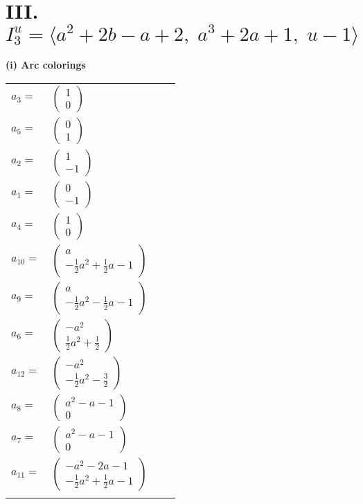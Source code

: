 \documentclass[1p]{elsarticle_modified}
\theoremstyle{definition}
\begin{document}
\centering \section*{III. $I^u_{3}= \langle a^2+2 b- a+2,\;a^3+2 a+1,\;u-1 \rangle$}
\flushleft \textbf{(i) Arc colorings}\\
\begin{tabular}{m{7pt} m{180pt} m{7pt} m{180pt} }
\flushright $a_{3}=$&$\begin{pmatrix}1\\0\end{pmatrix}$ \\
\flushright $a_{5}=$&$\begin{pmatrix}0\\1\end{pmatrix}$ \\
\flushright $a_{2}=$&$\begin{pmatrix}1\\-1\end{pmatrix}$ \\
\flushright $a_{1}=$&$\begin{pmatrix}0\\-1\end{pmatrix}$ \\
\flushright $a_{4}=$&$\begin{pmatrix}1\\0\end{pmatrix}$ \\
\flushright $a_{10}=$&$\begin{pmatrix}a\\-\frac{1}{2} a^2+\frac{1}{2} a-1\end{pmatrix}$ \\
\flushright $a_{9}=$&$\begin{pmatrix}a\\-\frac{1}{2} a^2-\frac{1}{2} a-1\end{pmatrix}$ \\
\flushright $a_{6}=$&$\begin{pmatrix}- a^2\\\frac{1}{2} a^2+\frac{1}{2}\end{pmatrix}$ \\
\flushright $a_{12}=$&$\begin{pmatrix}- a^2\\-\frac{1}{2} a^2-\frac{3}{2}\end{pmatrix}$ \\
\flushright $a_{8}=$&$\begin{pmatrix}a^2- a-1\\0\end{pmatrix}$ \\
\flushright $a_{7}=$&$\begin{pmatrix}a^2- a-1\\0\end{pmatrix}$ \\
\flushright $a_{11}=$&$\begin{pmatrix}- a^2-2 a-1\\-\frac{1}{2} a^2+\frac{1}{2} a-1\end{pmatrix}$\\&\end{tabular}
\end{document}
